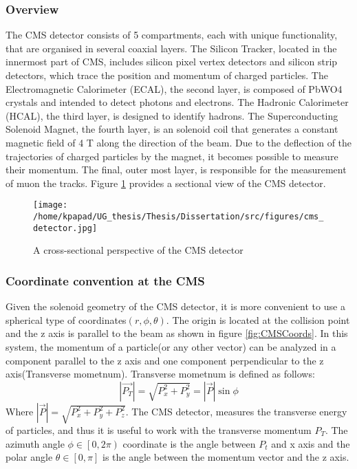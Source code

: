 \subsubsection{Overview}
\label{sec:org3cfeb42}
The CMS detector consists of 5 compartments, each with unique functionality, that are organised in several coaxial layers. The Silicon Tracker, located in the innermost part of CMS, includes silicon pixel vertex detectors and silicon strip detectors, which trace the position and momentum of charged particles. The Electromagnetic Calorimeter (ECAL), the second layer, is composed of PbWO4 crystals and intended to detect photons and electrons. The Hadronic Calorimeter (HCAL), the third layer, is designed to identify hadrons. The Superconducting Solenoid Magnet, the fourth layer, is an solenoid coil that generates a constant magnetic field of 4 T along the direction of the  beam. Due to the deflection of the trajectories of charged particles by the magnet, it becomes possible to measure their momentum. The final, outer most layer, is responsible for the measurement of muon the tracks. Figure \ref{fig:CMS_detector}\cite{CMSDetecorOverview} provides a sectional view of the CMS detector.
\begin{figure}[h]
\centering
\texttt{[image: /home/kpapad/UG\_thesis/Thesis/Dissertation/src/figures/cms\_detector.jpg]}
\caption{A cross-sectional perspective of the CMS detector}
\label{fig:CMS_detector}
\end{figure}

\subsubsection{Coordinate convention at the CMS}
\label{sec:orge8fa37a}
Given the solenoid geometry of the CMS detector, it is more convenient to use a spherical type of coordinates\(\left(r, \phi, \theta \right)\). The origin is located at the collision point and the z axis is parallel to the beam as shown in figure \ref{fig:CMSCoords}. In this system, the momentum of a particle(or any other vector) can be analyzed in a component parallel to the z axis and one component perpendicular to the z axis(Transverse mometnum). Transverse mometnum is defined as follows:
\begin{equation}
|\vec{P_{T}}| = \sqrt{P_{x}^{2} + P_{y}^{2}} = |\vec{P}|\sin{\phi}
\end{equation}
Where \(|\vec{P}| = \sqrt{P_{x}^{2} + P_{y}^{2} + P_{z}^{2}}\). The CMS detector, measures the transverse energy\cite{MomentumCMS} of particles, and thus it is useful to work with the transverse momentum \(P_{T}\). The azimuth angle  \(\phi \in \left[0, 2\pi\right)\) coordinate is the angle between \(P_{t}\) and x axis and the polar angle  \(\theta \in \left[0, \pi   \right]\) is the angle between the momentum vector and the z axis.

